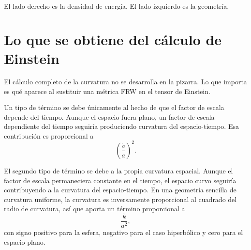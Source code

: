 El lado derecho es la densidad de energía. El lado izquierdo es la geometría.

\begin{classroomqa}
\end{classroomqa}

\begin{classroomqa}
\end{classroomqa}

\section{Lo que se obtiene del cálculo de Einstein}

El cálculo completo de la curvatura no se desarrolla en la pizarra. Lo que importa es qué aparece al sustituir una métrica FRW en el tensor de Einstein.

Un tipo de término se debe únicamente al hecho de que el factor de escala depende del tiempo. Aunque el espacio fuera plano, un factor de escala dependiente del tiempo seguiría produciendo curvatura del espacio-tiempo. Esa contribución es proporcional a
\begin{equation}
\left(\frac{\dot a}{a}\right)^2.
\end{equation}

El segundo tipo de término se debe a la propia curvatura espacial. Aunque el factor de escala permaneciera constante en el tiempo, el espacio curvo seguiría contribuyendo a la curvatura del espacio-tiempo. En una geometría sencilla de curvatura uniforme, la curvatura es inversamente proporcional al cuadrado del radio de curvatura, así que aporta un término proporcional a
\begin{equation}
\frac{k}{a^2},
\end{equation}
con signo positivo para la esfera, negativo para el caso hiperbólico y cero para el espacio plano.

